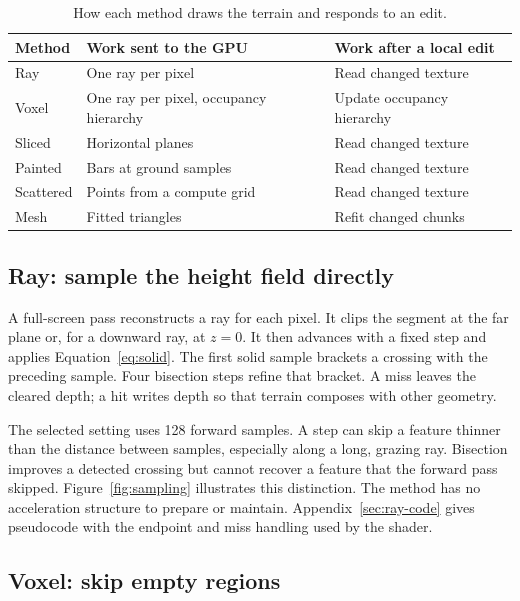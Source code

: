 \documentclass{jcgt}
\begin{document}
\begin{table}[tbp]\centering\small
\caption{How each method draws the terrain and responds to an edit.}\label{tab:methods}
\begin{tabularx}{\linewidth}{@{}l Y Y@{}}
\toprule
Method & Work sent to the GPU & Work after a local edit \\
\midrule
Ray & One ray per pixel & Read changed texture \\
Voxel & One ray per pixel, occupancy hierarchy & Update occupancy hierarchy \\
Sliced & Horizontal planes & Read changed texture \\
Painted & Bars at ground samples & Read changed texture \\
Scattered & Points from a compute grid & Read changed texture \\
Mesh & Fitted triangles & Refit changed chunks \\
\bottomrule
\end{tabularx}
\end{table}

\subsection{Ray: sample the height field directly}\label{sec:ray}

A full-screen pass reconstructs a ray for each pixel. It clips the segment at the far plane or, for a downward ray, at $z=0$. It then advances with a fixed step and applies Equation~\ref{eq:solid}. The first solid sample brackets a crossing with the preceding sample. Four bisection steps refine that bracket. A miss leaves the cleared depth; a hit writes depth so that terrain composes with other geometry.

The selected setting uses 128 forward samples. A step can skip a feature thinner than the distance between samples, especially along a long, grazing ray. Bisection improves a detected crossing but cannot recover a feature that the forward pass skipped. Figure~\ref{fig:sampling} illustrates this distinction. The method has no acceleration structure to prepare or maintain. Appendix~\ref{sec:ray-code} gives pseudocode with the endpoint and miss handling used by the shader.

\subsection{Voxel: skip empty regions}\label{sec:voxel}
\end{document}
